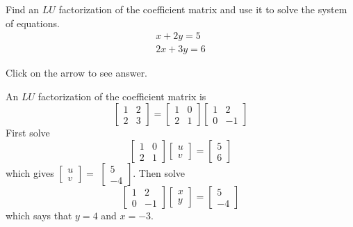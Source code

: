 \documentclass{ximera}
\begin{document}
\begin{problem}\label{prb:4.70} Find an $LU$ factorization of the coefficient matrix and use it to solve the system of equations.
\begin{equation*}
\begin{array}{c}
x+2y=5 \\
2x+3y=6
\end{array}
\end{equation*}

Click on the arrow to see answer.
\begin{expandable}
An $LU$ factorization of the coefficient matrix is
\[
\left[
\begin{array}{cc}
1 & 2 \\
2 & 3
\end{array}
\right] =  \left[
\begin{array}{cc}
1 & 0 \\
2 & 1
\end{array}
\right] \left[
\begin{array}{cc}
1 & 2 \\
0 & -1
\end{array}
\right]
\]
First solve
\[
\left[
\begin{array}{cc}
1 & 0 \\
2 & 1
\end{array}
\right] \left[
\begin{array}{c}
u \\
v
\end{array}
\right] =\left[
\begin{array}{c}
5 \\
6
\end{array}
\right]
\]
which gives $\left[
\begin{array}{c}
u \\
v
\end{array}
\right] =$ $\left[
\begin{array}{r}
5 \\
-4
\end{array}
\right] .$ Then solve
\[
\left[
\begin{array}{rr}
1 & 2 \\
0 & -1
\end{array}
\right] \left[
\begin{array}{c}
x \\
y
\end{array}
\right] =\left[
\begin{array}{r}
5 \\
-4
\end{array}
\right]
\]
which says that $y=4$ and $x=-3.$
\end{expandable}
\end{problem}
\end{document}
